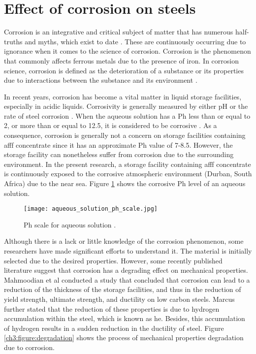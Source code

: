 \section{Effect of corrosion on steels}
Corrosion is an integrative and critical subject of matter that has numerous half-truths and myths, which exist to date \cite{mcarthur2004engineering}. These are continuously occurring due to ignorance when it comes to the science of corrosion.  Corrosion is the phenomenon that commonly affects ferrous metals due to the presence of iron. In corrosion science, corrosion is defined as the deterioration of a substance or its properties due to interactions between the substance and its environment \cite{chigondo2016recent}.

In recent years, corrosion has become a vital matter in liquid storage facilities, especially in acidic liquids. Corrosivity is generally measured by either pH or the rate of steel corrosion \cite{marzorati2018green}. When the aqueous solution has a Ph less than or equal to 2, or more than or equal to 12.5, it is considered to be corrosive \cite{marzorati2018green}. As a consequence, corrosion is generally not a concern on storage facilities containing \acrshort{afff} concentrate since it has an approximate Ph value of 7-8.5. However, the storage facility can nonetheless suffer from corrosion due to the surrounding environment. In the present research, a storage facility containing \acrshort{afff} concentrate is continuously exposed to the corrosive atmospheric environment (Durban, South Africa) due to the near sea. Figure \ref{ch3:figure:ph} shows the corrosive Ph level of an aqueous solution. 
 
\begin{figure}[H]
    \centering
    \texttt{[image: aqueous\_solution\_ph\_scale.jpg]}
    \caption{Ph scale for aqueous solution \cite{marzorati2018green}.}
    \label{ch3:figure:ph}
\end{figure}

Although there is a lack or little knowledge of the corrosion phenomenon, some researchers have made significant efforts to understand it. The material is initially selected due to the desired properties. However, some recently published literature suggest that corrosion has a degrading effect on mechanical properties. Mahmoodian et al \cite{li2018effect} conducted a study that concluded that corrosion can lead to a reduction of the thickness of the storage facilities, and thus in the reduction of yield strength, ultimate strength, and ductility on low carbon steels.  Marcus \cite{protopopoff2011surface} further stated that the reduction of these properties is due to hydrogen accumulation within the steel, which is known as \acrfull{he}. Besides, this accumulation of hydrogen results in a sudden reduction in the ductility of steel. Figure \ref{ch3:figure:degradation} shows the process of mechanical properties degradation due to corrosion.
 
